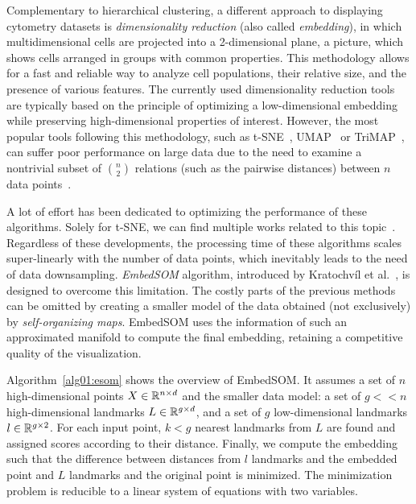 Complementary to hierarchical clustering, a different approach to displaying cytometry datasets is \emph{dimensionality reduction} (also called \emph{embedding}), in which multidimensional cells are projected into a 2-dimensional plane, a picture, which shows cells arranged in groups with common properties. This methodology allows for a fast and reliable way to analyze cell populations, their relative size, and the presence of various features. The currently used dimensionality reduction tools are typically based on the principle of optimizing a low-dimensional embedding while preserving high-dimensional properties of interest. However, the most popular tools following this methodology, such as t-SNE~\cite{maaten2008visualizing}, UMAP~\cite{becht2019dimensionality} or TriMAP~\cite{amid2019trimap}, can suffer poor performance on large data due to the need to examine a nontrivial subset of $\binom{n}{2}$ relations (such as the pairwise distances) between $n$ data points~\cite{kratochvil2019generalized}.

A lot of effort has been dedicated to optimizing the performance of these algorithms. Solely for t-SNE, we can find multiple works related to this topic~\cite{pezzotti2016hierarchical,pezzotti2016approximated,linderman2017efficient,belkina2018automated}. Regardless of these developments, the processing time of these algorithms scales super-linearly with the number of data points, which inevitably leads to the need of data downsampling. \emph{EmbedSOM} algorithm, introduced by Kratochvíl et al.~\cite{kratochvil2019generalized}, is designed to overcome this limitation. The costly parts of the previous methods can be omitted by creating a smaller model of the data obtained (not exclusively) by \emph{self-organizing maps}. EmbedSOM uses the information of such an approximated manifold to compute the final embedding, retaining a competitive quality of the visualization.

Algorithm~\ref{alg01:esom} shows the overview of EmbedSOM. It assumes a set of $n$ high-dimensional points $X \in \mathbb{R}^{n \times d}$ and the smaller data model: a set of $g << n$ high-dimensional landmarks $L \in \mathbb{R}^{g \times d}$, and a set of $g$ low-dimensional landmarks $l \in \mathbb{R}^{g \times 2}$. For each input point, $k < g$ nearest landmarks from $L$ are found and assigned scores according to their distance. Finally, we compute the embedding such that the difference between distances from $l$ landmarks and the embedded point and $L$ landmarks and the original point is minimized. The minimization problem is reducible to a linear system of equations with two variables.

